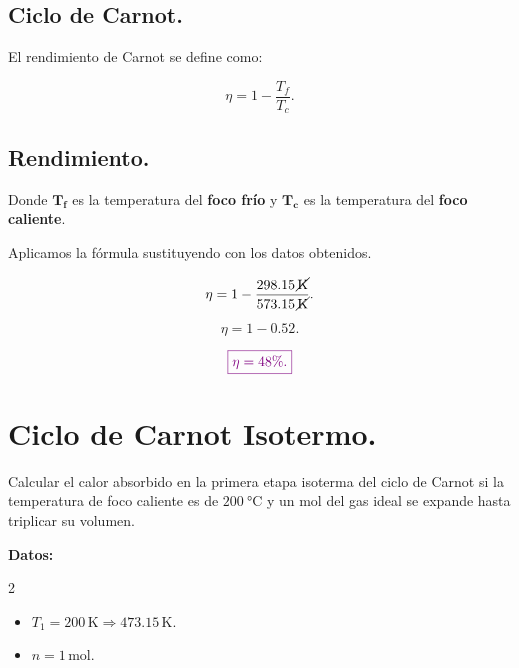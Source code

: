 \documentclass[a4paper,12pt]{article} %
\begin{document}
\subsection{Ciclo de Carnot.}

\begin{justify}
    El rendimiento de Carnot se define como:
\end{justify}

\[ \eta = 1 - \frac{T_f}{T_c}. \]

\vspace{\baselineskip}

\subsection{Rendimiento.}

\begin{justify}
    Donde \( \mathbf{T_f} \) es la temperatura del \textbf{foco frío} y \( \mathbf{T_c} \) es la temperatura del \textbf{foco caliente}.
\end{justify}

\begin{justify}
    Aplicamos la fórmula sustituyendo con los datos obtenidos.
\end{justify}

\[ \eta = 1 - \frac{298.15 \, \cancel{\mathrm{K}}}{573.15 \, \cancel{\mathrm{K}}}. \]

\[ \eta = 1 - 0.52. \]

\vspace{\baselineskip}

\[ \textcolor{violet}{\boxed{ \eta = 48 \% .}} \]

\vspace{\baselineskip}

\section{Ciclo de Carnot Isotermo.}

\begin{justify}
    Calcular el calor absorbido en la primera etapa isoterma del ciclo de Carnot si la temperatura de foco caliente es de \( \SI{200}{\degreeCelsius} \) y un mol del gas ideal se expande hasta triplicar su volumen.
\end{justify}

\begin{justify}
    \textbf{Datos:}
\end{justify}

\begin{multicols}{2}
    \begin{itemize}
        \item \( T_1 = 200 \, \mathrm{K} \Rightarrow 473.15 \, \mathrm{K}. \)
        \item \( n = 1 \, \mathrm{mol}. \)
    \end{itemize}
\end{multicols}
\end{document}

